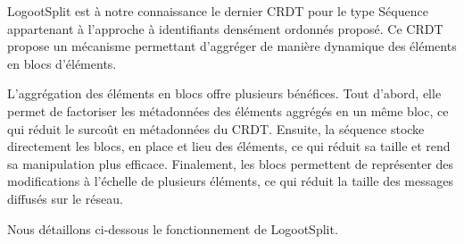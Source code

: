 \label{sec:logootsplit}

LogootSplit \cite{2013-logootsplit} est à notre connaissance le dernier \ac{CRDT} pour le type Séquence appartenant à l'approche à identifiants densément ordonnés proposé.
Ce \ac{CRDT} propose un mécanisme permettant d'aggréger de manière dynamique des éléments en blocs d'éléments.

L'aggrégation des éléments en blocs offre plusieurs bénéfices.
Tout d'abord, elle permet de factoriser les métadonnées des éléments aggrégés en un même bloc, ce qui réduit le surcoût en métadonnées du \ac{CRDT}.
Ensuite, la séquence stocke directement les blocs, en place et lieu des éléments, ce qui réduit sa taille et rend sa manipulation plus efficace.
Finalement, les blocs permettent de représenter des modifications à l'échelle de plusieurs éléments, ce qui réduit la taille des messages diffusés sur le réseau.

Nous détaillons ci-dessous le fonctionnement de LogootSplit.
